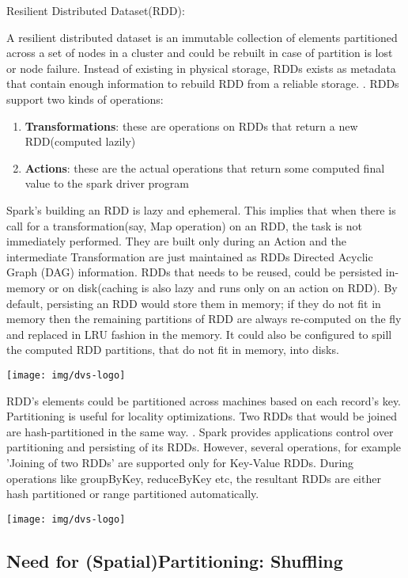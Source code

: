 \documentclass[article,type=msc,colorback,10pt,accentcolor=tud1d]{tudthesis}
\begin{document}
		   Resilient Distributed Dataset(RDD):
		   
		   A resilient distributed dataset is an immutable collection of elements partitioned across a set of nodes in a cluster and could be rebuilt in case of partition is lost or node failure. Instead of existing in physical storage, RDDs exists as metadata that contain enough information to rebuild RDD from a reliable storage. \cite{sparkmainpaper}. 
		   RDDs support two kinds of operations:
		   \begin{enumerate}
		   	\item \textbf{Transformations}: these are operations on RDDs that return a new RDD(computed lazily)
		    \item \textbf{Actions}: these are the actual operations that return some computed final value to the spark driver program \cite{sparkbook}
		   \end{enumerate}
		   
		   Spark's building an RDD is lazy and ephemeral. This implies that when there is call for a transformation(say, Map operation) on an RDD, the task is not immediately performed. They are built only during an Action and the intermediate Transformation are just maintained as RDDs Directed Acyclic Graph (DAG) information. RDDs that needs to be reused, could be persisted in-memory or on disk(caching is also lazy and runs only on an action on RDD). By default, persisting an RDD would store them in memory; if they do not fit in memory then the remaining partitions of RDD are always re-computed on the fly and replaced in LRU fashion in the memory. It could also be configured to spill the computed RDD partitions, that do not fit in memory, into disks. 
		   
		   
		   \texttt{[image: img/dvs-logo]}
		   
		   RDD's elements could be partitioned across machines based on each record's key. Partitioning is useful for locality optimizations. Two RDDs that would be joined are hash-partitioned in the same way. \cite{RDDmainpaper}. Spark provides applications control over partitioning and persisting of its RDDs. However, several operations, for example 'Joining of two RDDs' are supported only for Key-Value RDDs.  During operations like groupByKey, reduceByKey etc, the resultant RDDs are either hash partitioned or range partitioned automatically.
		   
		     \texttt{[image: img/dvs-logo]}
		   
		   \subsection{Need for (Spatial)Partitioning: Shuffling}
		   
\end{document}

